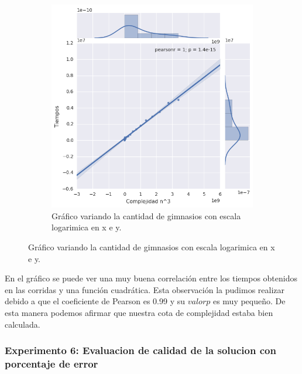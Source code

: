 \begin{figure}[H]
\begin{center}
    \begin{subfigure}[b]{0.60\textwidth}
        \includegraphics[width=\textwidth]{img/ejercicio2/losPosta/pearsonncubo.png}
        \caption{Gráfico variando la cantidad de gimnasios con escala logarimica en x e y.}
        \label{fig: ejercicio1_ejemplo_camino1_2}
	   \end{subfigure}

  \end{center}
\end{figure}

En el gr\'afico se puede ver una muy buena correlaci\'on entre los tiempos obtenidos en las corridas y una funci\'on cuadr\'atica. Esta observaci\'on la pudimos realizar debido a que el coeficiente de Pearson es 0.99 y su $valor p$ es muy pequeño. De esta manera podemos afirmar que nuestra cota de complejidad estaba bien calculada.


\subsubsection{Experimento 6: Evaluacion de calidad de la solucion con porcentaje de error }

